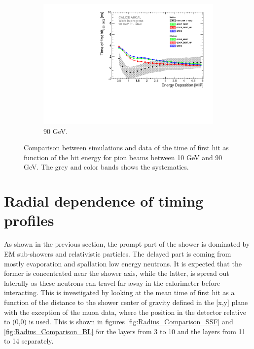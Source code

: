 \begin{figure}[htbp!]
\begin{subfigure}[t]{0.5\textwidth}
		\includegraphics[width=1\textwidth]{../Thesis_Plots/Timing/Pions/Plots/ComparisonToSim/Time_Energy_90GeV.pdf}
		\caption{90 GeV.} \label{fig:Energy_SimData_90GeV}
	\end{subfigure}
	\caption{Comparison between simulations and data of the time of first hit as function of the hit energy for pion beams between 10 GeV and 90 GeV. The grey and color bands shows the systematics.}
	\label{fig:Energy_SimData_Comparison}
\end{figure}

\section{Radial dependence of timing profiles}

As shown in the previous section, the prompt part of the shower is dominated by EM sub-showers and relativistic particles. The delayed part is coming from mostly evaporation and spallation low energy neutrons. It is expected that the former is concentrated near the shower axis, while the latter, is spread out laterally as these neutrons can travel far away in the calorimeter before interacting. This is investigated by looking at the mean time of first hit as a function of the distance to the shower center of gravity defined in the [x,y] plane with the exception of the muon data, where the position in the detector relative to (0,0) is used. This is shown in figures \ref{fig:Radius_Comparison_SSF} and \ref{fig:Radius_Comparison_BL} for the layers from 3 to 10 and the layers from 11 to 14 separately.


